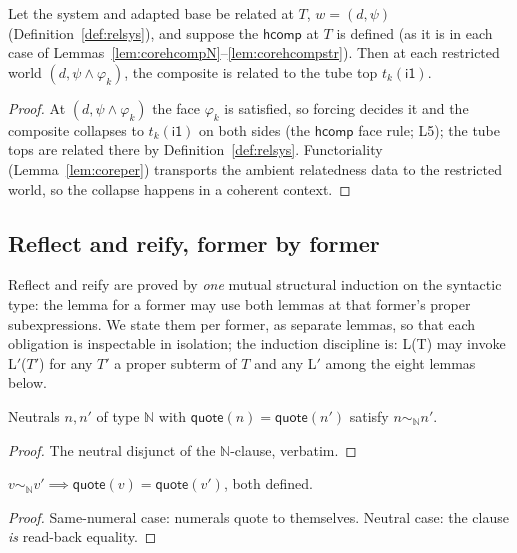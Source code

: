 \documentclass{lmcs}
\newcommand{\hcomp}{\mathsf{hcomp}}
\newcommand{\ii}{\mathsf{i1}}
\newcommand{\quo}{\mathsf{quote}}
\begin{document}
\begin{lem}\label{lem:boundary}
  Let the system and adapted base be related at $T$, $w = (d,
  \psi)$ (Definition~\ref{def:relsys}), and suppose the $\hcomp$
  at $T$ is defined (as it is in each case of
  Lemmas~\ref{lem:corehcompN}--\ref{lem:corehcompstr}).  Then at
  each restricted world $(d, \psi \wedge \varphi_k)$, the composite
  is related to the tube top $t_k(\ii)$.
\end{lem}
\begin{proof}
  At $(d, \psi \wedge \varphi_k)$ the face $\varphi_k$ is
  satisfied, so forcing decides it and the composite collapses to
  $t_k(\ii)$ on both sides (the $\hcomp$ face rule; L5); the tube
  tops are related there by Definition~\ref{def:relsys}.
  Functoriality (Lemma~\ref{lem:coreper}) transports the ambient
  relatedness data to the restricted world, so the collapse happens
  in a coherent context.
\end{proof}

\subsection{Reflect and reify, former by former}
\label{app:corereify}

Reflect and reify are proved by \emph{one} mutual structural
induction on the syntactic type: the lemma for a former may use both
lemmas at that former's proper subexpressions.  We state them per
former, as separate lemmas, so that each obligation is inspectable
in isolation; the induction discipline is: L(T) may invoke
L$'$($T'$) for any $T'$ a proper subterm of $T$ and any L$'$ among
the eight lemmas below.

\begin{lem}\label{lem:reflN}
  Neutrals $n, n'$ of type $\mathbb{N}$ with $\quo(n) = \quo(n')$
  satisfy $n \sim_{\mathbb{N}} n'$.
\end{lem}
\begin{proof}
  The neutral disjunct of the $\mathbb{N}$-clause, verbatim.
\end{proof}

\begin{lem}\label{lem:reifN}
  $v \sim_{\mathbb{N}} v' \implies \quo(v) = \quo(v')$, both
  defined.
\end{lem}
\begin{proof}
  Same-numeral case: numerals quote to themselves.  Neutral case:
  the clause \emph{is} read-back equality.
\end{proof}
\end{document}

